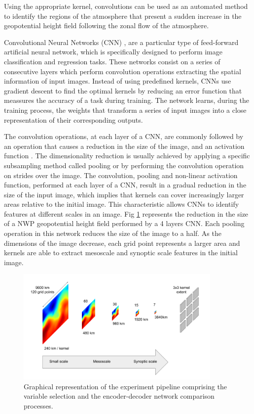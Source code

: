 \documentclass[twocol]{ametsoc}
\begin{document}
Using the appropriate kernel, convolutions can be used as an automated method to identify the regions of the atmosphere that present a sudden increase in the geopotential height field following the zonal flow of the atmosphere.

Convolutional Neural Networks (CNN) \citep{lecun2010convolutional}, are a particular type of feed-forward artificial neural network, which is specifically designed to perform image classification and regression tasks. These networks consist on a series of consecutive layers which perform convolution operations extracting the spatial information of input images. Instead of using predefined kernels, CNNs use gradient descent \citep{bottou2010large} to find the optimal kernels by reducing an error function that meassures the accuracy of a task during training. The network learns, during the training process, the weights that transform a series of input images into a close representation of their corresponding outputs.

The convolution operations, at each layer of a CNN, are commonly followed by an operation that causes a reduction in the size of the image, and an activation function \citep{glorot2010understanding}. The dimensionality reduction is usually achieved by applying a specific subsampling method called pooling \citep{scherer2010evaluation} or by performing the convolution operation on strides over the image. The convolution, pooling and non-linear activation function, performed at each layer of a CNN, result in a gradual reduction in the size of the input image, which implies that kernels can cover increasingly larger areas relative to the initial image. This characteristic allows CNNs to identify features at different scales in an image. Fig \ref{cnn_scales} represents the reduction in the size of a NWP geopotential height field performed by a 4 layers CNN. Each pooling operation in this network reduces the size of the image to a half. As the dimensions of the image decrease, each grid point represents a larger area and kernels are able to extract mesoscale and synoptic scale features in the initial image. 

\begin{figure}[h]
 \centerline{\includegraphics[width=10cm]{cnn_scales.png}}
  \caption{Graphical representation of the experiment pipeline comprising the variable selection and the encoder-decoder network comparison processes.}\label{cnn_scales}
\end{figure}
\end{document}
